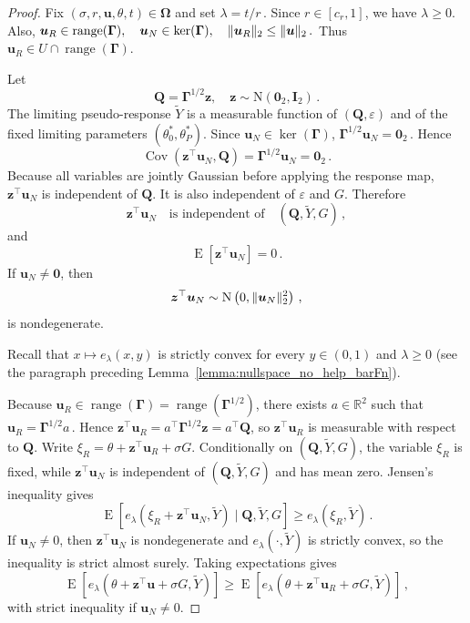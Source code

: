 \documentclass{article}
\makeatletter
\DeclareMathOperator{\expect}{E}
\theoremstyle{definition}
\newcommand{\vnorm}[1]{%
	\ensuremath{%
		\if@display
		\left\| #1 \right\|
		\else
		\| #1 \|
		\fi
	}%
}
\newcommand*{\bb}{\boldsymbol}
\def\bu{\bb{u}}
\def\Ytil{\widetilde{Y}}
\def\bz{\bb{z}}
\newcommand{\range}{\operatorname{range}}
\makeatother
\begin{document}
\begin{bibunit}
	\begin{proof}
		Fix $(\sigma,r,\bu,\theta,t)\in\bb\Omega$ and set $\lambda=t/r\,.$
		Since $r\in[c_r,1]$, we have $\lambda\geq0$. Also,
		$\bu_R\in\range(\bb\Gamma), \quad \bu_N\in\ker(\bb\Gamma), \quad \vnorm{\bu_R}_2\leq\vnorm{\bu}_2\,.$
	Thus $\bu_R\in U\cap\range(\bb\Gamma)$.

	Let
	$$
		\bb Q
		=
		\bb\Gamma^{1/2}\bz,
		\quad
		\bz
		\sim
		\mathrm N(\bb0_2,\bb I_2)\,.
	$$
	The limiting pseudo-response $\Ytil$ is a measurable function of
	$(\bb Q,\varepsilon)$ and of the fixed limiting parameters
	$(\theta_0^*,\theta_P^*)$. Since $\bu_N\in\ker(\bb\Gamma)$,
	$\bb\Gamma^{1/2}\bu_N=\bb0_2\,.$ Hence
	$$
		\operatorname{Cov}
		\left(
			\bz^\top\bu_N,
			\bb Q
		\right)
		=
		\bb\Gamma^{1/2}\bu_N
		=
		\bb0_2\,.
	$$
	Because all variables are jointly Gaussian before applying the response
	map, $\bz^\top\bu_N$ is independent of $\bb Q$. It is also independent of
	$\varepsilon$ and $G$. Therefore
	$$
		\bz^\top\bu_N
		\quad\text{is independent of}\quad
		(\bb Q,\Ytil,G)\,,
	$$
	and
	$$
		\expect[\bz^\top\bu_N]
		=
		0\,.
	$$
	If $\bu_N\neq\bb0$, then
	$$
		\bz^\top\bu_N
		\sim
		\mathrm N
		\left(
			0,
			\vnorm{\bu_N}_2^2
		\right)\,,
	$$
	is nondegenerate.

		Recall that $x\mapsto e_\lambda(x,y)$ is strictly convex for every $y\in(0,1)$ and $\lambda\geq0$ (see the paragraph preceding Lemma~\ref{lemma:nullspace_no_help_barFn}).

	Because $\bu_R\in\range(\bb\Gamma)=\range(\bb\Gamma^{1/2})$, there
	exists $a\in\mathbb R^2$ such that $\bu_R=\bb\Gamma^{1/2}a\,.$
	Hence
	$
		\bz^\top\bu_R
		=
		a^\top\bb\Gamma^{1/2}\bz
		=
		a^\top\bb Q
	$,
	so $\bz^\top\bu_R$ is measurable with respect to $\bb Q$. Write $\xi_R=\theta+\bz^\top\bu_R+\sigma G$. Conditionally on
	$(\bb Q,\Ytil,G)$, the variable $\xi_R$ is fixed, while $\bz^\top\bu_N$ is independent of
	$(\bb Q,\Ytil,G)$ and has mean zero. Jensen's inequality gives
	$$
		\expect
		\left[
			e_\lambda(\xi_R+\bz^\top\bu_N,\Ytil)
			\mid \bb Q,\Ytil,G
		\right]
		\geq
		e_\lambda(\xi_R,\Ytil)\,.
	$$
	If $\bu_N\neq0$, then $\bz^\top\bu_N$ is nondegenerate and
	$e_\lambda(\cdot,\Ytil)$ is strictly convex, so the inequality is strict almost
	surely. Taking expectations gives
	$$
		\expect
		\left[
			e_\lambda
			\left(
				\theta+\bz^\top\bu+\sigma G,\Ytil
			\right)
		\right]
		\geq
		\expect
		\left[
			e_\lambda
			\left(
				\theta+\bz^\top\bu_R+\sigma G,\Ytil
			\right)
		\right]\,,
	$$
	with strict inequality if $\bu_N\neq0$.


\end{proof}
\end{bibunit}
\end{document}
